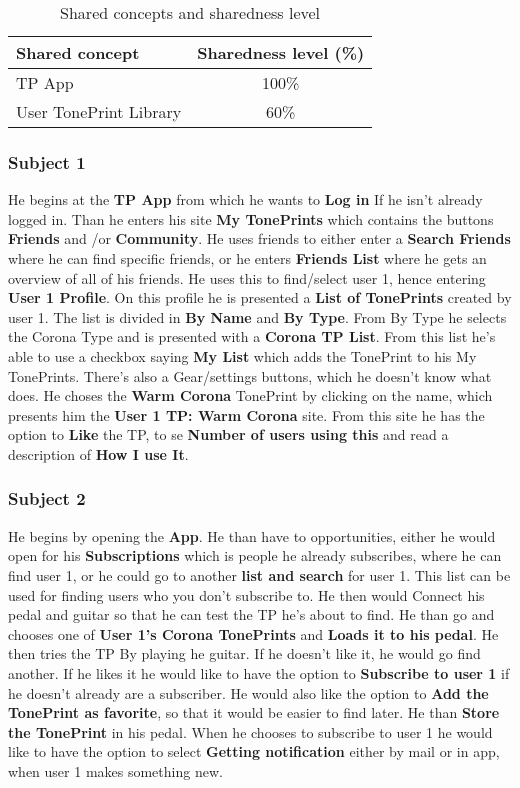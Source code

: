 \begin{table}[H]
	\centering
	\begin{tabular}[width=\textwidth]{|l|c|}
	\hline
	Shared concept & Sharedness level (\%) \\ \hline
	TP App & 100\% \\ 
	User TonePrint Library & 60\% \\ \hline
	\end{tabular}
	\caption{Shared concepts and sharedness level}
	\label{tab:SharedConcept}
\end{table}


\subsubsection{Subject 1}
\label{Subject1ICMM}
He begins at the \textbf{TP App} from which he wants to \textbf{Log in} If he isn’t already logged in. Than he enters his site \textbf{My TonePrints} which contains the buttons \textbf{Friends} and /or \textbf{Community}. He uses friends to either enter a \textbf{Search Friends} where he can find specific friends, or he enters \textbf{Friends List} where he gets an overview of all of his friends. He uses this to find/select user 1, hence entering \textbf{User 1 Profile}. On this profile he is presented a \textbf{List of TonePrints} created by user 1. The list is divided in \textbf{By Name} and \textbf{By Type}. From By Type he selects the Corona Type and is presented with a \textbf{Corona TP List}. From this list he’s able to use a checkbox saying \textbf{My List} which adds the TonePrint to his My TonePrints. There’s also a Gear/settings buttons, which he doesn’t know what does. He choses the \textbf{Warm Corona} TonePrint by clicking on the name, which presents him the \textbf{User 1 TP: Warm Corona} site. From this site he has the option to \textbf{Like} the TP, to se \textbf{Number of users using this} and read a description of \textbf{How I use It}.

\subsubsection{Subject 2}
\label{Subject2ICMM}
He begins by opening the \textbf{App}. He than have to opportunities, either he would open for his \textbf{Subscriptions} which is people he already subscribes, where he can find user 1, or he could go to another \textbf{list and search} for user 1. This list can be used for finding users who you don’t subscribe to. He then would Connect his pedal and guitar so that he can test the TP he’s about to find. He than go and chooses one of \textbf{User 1's Corona TonePrints} and \textbf{Loads it to his pedal}. He then tries the TP By playing he guitar. If he doesn’t like it, he would go find another. If he likes it he would like to have the option to \textbf{Subscribe to user 1} if he doesn’t already are a subscriber. He would also like the option to \textbf{Add the TonePrint as favorite}, so that it would be easier to find later. He than \textbf{Store the TonePrint} in his pedal. When he chooses to subscribe to user 1 he would like to have the option to select \textbf{Getting notification} either by mail or in app, when user 1 makes something new.

